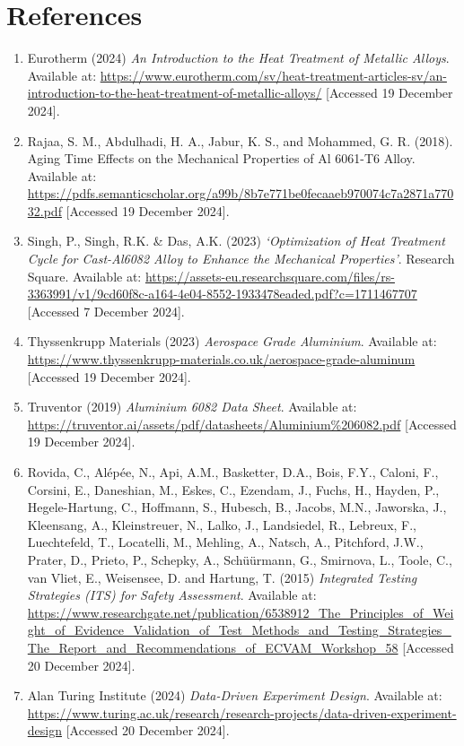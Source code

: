 \documentclass{article}
\begin{document}
    \newpage\vspace*{-5pt}
    \section{References}
    \begin{enumerate}
        \item Eurotherm (2024) \textit{An Introduction to the Heat Treatment of Metallic Alloys}. Available at: \url{https://www.eurotherm.com/sv/heat-treatment-articles-sv/an-introduction-to-the-heat-treatment-of-metallic-alloys/} [Accessed 19 December 2024].
        
        \item Rajaa, S. M., Abdulhadi, H. A., Jabur, K. S., and Mohammed, G. R. (2018). Aging Time Effects on the Mechanical Properties of Al 6061-T6 Alloy. Available at: \url{https://pdfs.semanticscholar.org/a99b/8b7e771be0fecaaeb970074c7a2871a77032.pdf} [Accessed 19 December 2024].        

        \item Singh, P., Singh, R.K. \& Das, A.K. (2023) \textit{‘Optimization of Heat Treatment Cycle for Cast-Al6082 Alloy to Enhance the Mechanical Properties’}. Research Square. Available at: \url{https://assets-eu.researchsquare.com/files/rs-3363991/v1/9cd60f8c-a164-4e04-8552-1933478eaded.pdf?c=1711467707} [Accessed 7 December 2024].
        
        \item Thyssenkrupp Materials (2023) \textit{Aerospace Grade Aluminium}. Available at: \url{https://www.thyssenkrupp-materials.co.uk/aerospace-grade-aluminum} [Accessed 19 December 2024].
        
        \item Truventor (2019) \textit{Aluminium 6082 Data Sheet}. Available at: \url{https://truventor.ai/assets/pdf/datasheets/Aluminium%206082.pdf} [Accessed 19 December 2024].
        
        \item Rovida, C., Alépée, N., Api, A.M., Basketter, D.A., Bois, F.Y., Caloni, F., Corsini, E., Daneshian, M., Eskes, C., Ezendam, J., Fuchs, H., Hayden, P., Hegele-Hartung, C., Hoffmann, S., Hubesch, B., Jacobs, M.N., Jaworska, J., Kleensang, A., Kleinstreuer, N., Lalko, J., Landsiedel, R., Lebreux, F., Luechtefeld, T., Locatelli, M., Mehling, A., Natsch, A., Pitchford, J.W., Prater, D., Prieto, P., Schepky, A., Schüürmann, G., Smirnova, L., Toole, C., van Vliet, E., Weisensee, D. and Hartung, T. (2015) \textit{Integrated Testing Strategies (ITS) for Safety Assessment}. Available at: \url{https://www.researchgate.net/publication/6538912_The_Principles_of_Weight_of_Evidence_Validation_of_Test_Methods_and_Testing_Strategies_The_Report_and_Recommendations_of_ECVAM_Workshop_58} [Accessed 20 December 2024].
        
        \item Alan Turing Institute (2024) \textit{Data-Driven Experiment Design}. Available at: \url{https://www.turing.ac.uk/research/research-projects/data-driven-experiment-design} [Accessed 20 December 2024].
        
    \end{enumerate}
\end{document}
